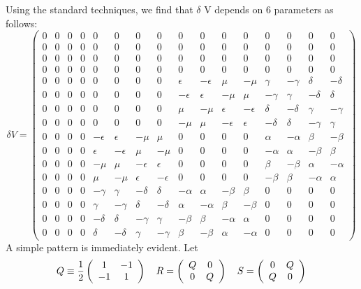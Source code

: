 \documentclass[12pt]{article}
\begin{document}
 Using the standard techniques, we find that $\delta$ V depends on 6
parameters as follows:
\begin{equation}
\delta V = \left(
\begin{array}{cccccccccccccccc}
0 & 0 & 0 & 0 & 0 & 0 & 0 & 0 & 0 & 0 & 0 & 0 & 0 & 0 & 0 & 0 \\
0 & 0 & 0 & 0 & 0 & 0 & 0 & 0 & 0 & 0 & 0 & 0 & 0 & 0 & 0 & 0 \\
0 & 0 & 0 & 0 & 0 & 0 & 0 & 0 & 0 & 0 & 0 & 0 & 0 & 0 & 0 & 0 \\
0 & 0 & 0 & 0 & 0 & 0 & 0 & 0 & 0 & 0 & 0 & 0 & 0 & 0 & 0 & 0 \\
0 & 0 & 0 & 0 & 0 & 0 & 0 & 0 & \epsilon & -\epsilon & \mu & -\mu
& \gamma & -\gamma & \delta & -\delta \\
0 & 0 & 0 & 0 & 0 & 0 & 0 & 0 & -\epsilon & \epsilon & -\mu & \mu
& -\gamma & \gamma & -\delta & \delta \\
0 & 0 & 0 & 0 & 0 & 0 & 0 & 0 & \mu & -\mu & \epsilon & -\epsilon
& \delta & -\delta & \gamma & -\gamma \\
0 & 0 & 0 & 0 & 0 & 0 & 0 & 0 & -\mu & \mu & -\epsilon & \epsilon
& -\delta & \delta & -\gamma & \gamma \\
0 & 0 & 0 & 0 & -\epsilon & \epsilon & -\mu & \mu & 0 & 0 & 0 & 0 & 
\alpha & -\alpha & \beta & -\beta \\
0 & 0 & 0 & 0 & \epsilon & -\epsilon & \mu & -\mu & 0 & 0 & 0 & 0 & 
-\alpha & \alpha & -\beta & \beta \\
0 & 0 & 0 & 0 & -\mu & \mu & -\epsilon & \epsilon & 0 & 0 & 0 & 0 & 
\beta & -\beta & \alpha & -\alpha \\
0 & 0 & 0 & 0 & \mu & -\mu & \epsilon & -\epsilon & 0 & 0 & 0 & 0 & 
-\beta & \beta & -\alpha & \alpha \\
0 & 0 & 0 & 0 & -\gamma & \gamma & -\delta & \delta & -\alpha & \alpha &
-\beta & \beta & 0 & 0 & 0 & 0 \\
0 & 0 & 0 & 0 & \gamma & -\gamma & \delta & -\delta & \alpha & -\alpha &
\beta & -\beta & 0 & 0 & 0 & 0 \\
0 & 0 & 0 & 0 & -\delta & \delta & -\gamma & \gamma & -\beta & \beta &
-\alpha & \alpha & 0 & 0 & 0 & 0 \\
0 & 0 & 0 & 0 & \delta & -\delta & \gamma & -\gamma & \beta & -\beta &
\alpha & -\alpha & 0 & 0 & 0 & 0
\end{array} \right) 
\end{equation}
A simple pattern is immediately evident.  Let
\begin{equation}
Q \equiv  {1 \over 2} \left(
\begin{array}{cc}
1 & -1 \\
-1 & 1
\end{array}
\right) \quad
R = \left(
\begin{array}{cc}
Q & 0 \\
0 & Q
\end{array}
\right) \quad
S = \left(
\begin{array}{cc}
0 & Q \\
Q & 0
\end{array}
\right)
\end{equation}
\end{document}
